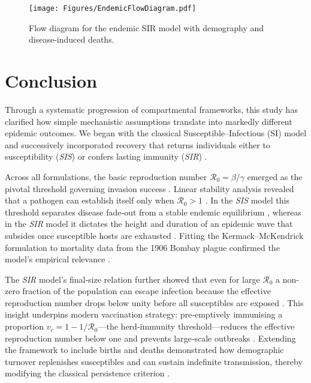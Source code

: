 \documentclass[11pt]{article}
\newcommand{\RR}{\mathcal{R}_0}
\begin{document}
\begin{figure}[H]
  \centering
  \texttt{[image: Figures/EndemicFlowDiagram.pdf]}
  \caption{Flow diagram for the endemic SIR model with demography and
           disease-induced deaths.}
  \label{fig:flowdiagram}
\end{figure}


\hfill
\section{Conclusion}

Through a systematic progression of compartmental frameworks, this study has
clarified how simple mechanistic assumptions translate into markedly different
epidemic outcomes. We began with the classical Susceptible–Infectious (SI)
model \citep{Anderson1991} and successively incorporated recovery that returns
individuals either to susceptibility (\textit{SIS}) \citep{Hethcote2000} or
confers lasting immunity (\textit{SIR}) \citep{Kermack1927}.

Across all formulations, the basic reproduction number
$\RR = \beta/\gamma$ emerged as the pivotal threshold governing invasion
success \citep{Diekmann1990}. Linear stability analysis revealed that a
pathogen can establish itself only when $\RR > 1$ \citep{Anderson1991}.  
In the \textit{SIS} model this threshold separates disease fade‐out from a
stable endemic equilibrium \citep{Keeling2008}, whereas in the \textit{SIR}
model it dictates the height and duration of an epidemic wave that subsides
once susceptible hosts are exhausted \citep{Brauer2019}. Fitting the
Kermack–McKendrick formulation to mortality data from the 1906 Bombay plague
confirmed the model’s empirical relevance \citep{Kermack1927}.

The \textit{SIR} model’s final‐size relation further showed that even for large
$\RR$ a non-zero fraction of the population can escape infection because the
effective reproduction number drops below unity before all susceptibles are
exposed \citep{Hethcote2000}. This insight underpins modern vaccination
strategy: pre‐emptively immunising a proportion
$v_c = 1 - 1/\RR$—the herd‐immunity threshold—reduces the effective
reproduction number below one and prevents large‐scale outbreaks
\citep{Fine2011}. Extending the framework to include births and deaths
demonstrated how demographic turnover replenishes susceptibles and can sustain
indefinite transmission, thereby modifying the classical persistence criterion
\citep{Anderson1991}.
\end{document}
